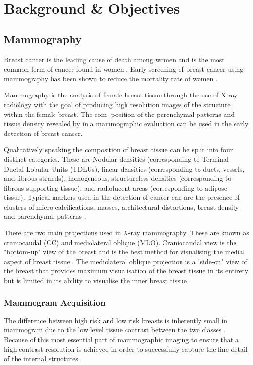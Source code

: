 \chapter{Background \& Objectives}

\section{Mammography}

Breast cancer is the leading cause of death among women and is the most common form of cancer found in women \cite{siegel2014cancer}. Early screening of breast cancer using mammography has been shown to reduce the mortality rate of women \cite{independent2012benefits, smith2014cancer}.

Mammography is the analysis of female breast tissue through the use of X-ray radiology with the goal of producing high resolution images of the structure within the female breast. The com- position of the parenchymal patterns and tissue density revealed by in a mammographic evaluation can be used in the early detection of breast cancer.

Qualitatively speaking the composition of breast tissue can be split into four distinct categories. These are Nodular densities (corresponding to Terminal Ductal Lobular Units (TDLUs), linear densities (corresponding to ducts, vessels, and fibrous strands), homogeneous, structureless densities (corresponding to fibrous supporting tissue), and radiolucent areas (corresponding to adipose tissue)\cite{tabar2005breast}. Typical markers used in the detection of cancer can are the presence of clusters of micro-calcifications, masses, architectural distortions, breast density and parenchymal patterns \cite{mccormack2006breast, sampat2005computer}.

There are two main projections used in X-ray mammography. These are known as craniocaudal (CC) and mediolateral oblique (MLO). Craniocaudal view is the "bottom-up" view of the breast and is the best method for visualising the medial aspect of breast tissue \cite{fischer2008breast}. The mediolateral oblique projection is a "side-on" view of the breast that provides maximum visualisation of the breast tissue in its entirety but is limited in its ability to visualise the inner breast tissue \cite{fischer2008breast}.

\subsection{Mammogram Acquisition}
The difference between high risk and low risk breasts is inherently small in mammogram due to the low level tissue contrast between the two classes \cite{kopans1998breast}. Because of this most essential part of mammographic imaging to ensure that a high contrast resolution is achieved in order to successfully capture the fine detail of the internal structures.

